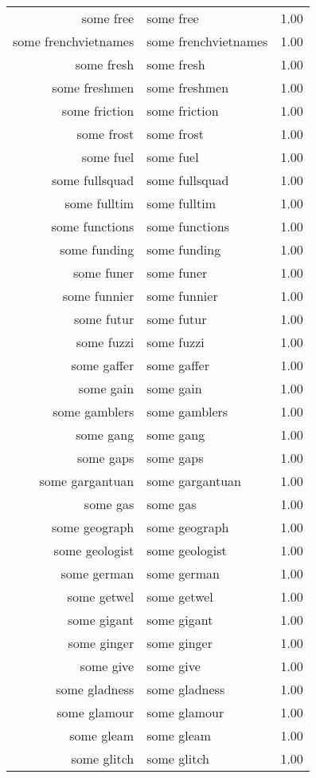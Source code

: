 \begin{table}[ht]
\begin{tabular}{rlr}
  some free & some free & 1.00 \\ 
  some frenchvietnames & some frenchvietnames & 1.00 \\ 
  some fresh & some fresh & 1.00 \\ 
  some freshmen & some freshmen & 1.00 \\ 
  some friction & some friction & 1.00 \\ 
  some frost & some frost & 1.00 \\ 
  some fuel & some fuel & 1.00 \\ 
  some fullsquad & some fullsquad & 1.00 \\ 
  some fulltim & some fulltim & 1.00 \\ 
  some functions & some functions & 1.00 \\ 
  some funding & some funding & 1.00 \\ 
  some funer & some funer & 1.00 \\ 
  some funnier & some funnier & 1.00 \\ 
  some futur & some futur & 1.00 \\ 
  some fuzzi & some fuzzi & 1.00 \\ 
  some gaffer & some gaffer & 1.00 \\ 
  some gain & some gain & 1.00 \\ 
  some gamblers & some gamblers & 1.00 \\ 
  some gang & some gang & 1.00 \\ 
  some gaps & some gaps & 1.00 \\ 
  some gargantuan & some gargantuan & 1.00 \\ 
  some gas & some gas & 1.00 \\ 
  some geograph & some geograph & 1.00 \\ 
  some geologist & some geologist & 1.00 \\ 
  some german & some german & 1.00 \\ 
  some getwel & some getwel & 1.00 \\ 
  some gigant & some gigant & 1.00 \\ 
  some ginger & some ginger & 1.00 \\ 
  some give & some give & 1.00 \\ 
  some gladness & some gladness & 1.00 \\ 
  some glamour & some glamour & 1.00 \\ 
  some gleam & some gleam & 1.00 \\ 
  some glitch & some glitch & 1.00 \\ 

\end{tabular}
\end{table}
